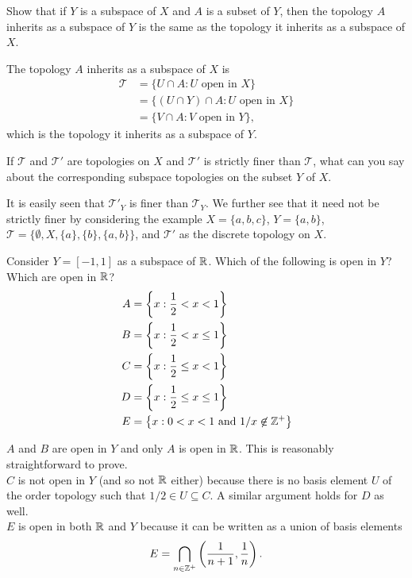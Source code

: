 \begin{exercise}
	Show that if $Y$ is a subspace of $X$ and $A$ is a subset of $Y$, then the topology $A$ inherits as a subspace of $Y$ is the same as the topology it inherits as a subspace of $X$.
\end{exercise}
\begin{solution*}	
	The topology $A$ inherits as a subspace of $X$ is
	\begin{align*}
		\mathcal{T} &= \{ U\cap A : U\text{ open in }X \} \\
			&= \{ (U\cap Y) \cap A : U\text{ open in }X \} \\
			&= \{ V\cap A : V\text{ open in }Y \},
	\end{align*}
	which is the topology it inherits as a subspace of $Y$.
\end{solution*}

\begin{exercise}
	If $\mathcal{T}$ and $\mathcal{T}'$ are topologies on $X$ and $\mathcal{T}'$ is strictly finer than $\mathcal{T}$, what can you say about the corresponding subspace topologies on the subset $Y$ of $X$.
\end{exercise}
\begin{solution*}
	It is easily seen that $\mathcal{T}'_Y$ is finer than $\mathcal{T}_Y$. We further see that it need not be strictly finer by considering the example $X=\{a,b,c\}$, $Y=\{a,b\}$, $\mathcal{T}=\{\emptyset,X,\{a\},\{b\},\{a,b\}\}$, and $\mathcal{T}'$ as the discrete topology on $X$.
\end{solution*}

\begin{exercise}
	Consider $Y=[-1,1]$ as a subspace of $\mathbb{R}$. Which of the following is open in $Y$? Which are open in $\mathbb{R}$?
	\begin{align*}
		A &= \left\{ x : \frac{1}{2} < x < 1 \right\} \\
		B &= \left\{ x : \frac{1}{2} < x \leq 1 \right\} \\
		C &= \left\{ x : \frac{1}{2} \leq x < 1 \right\} \\
		D &= \left\{ x : \frac{1}{2} \leq x \leq 1 \right\} \\
		E &= \left\{ x : 0 < x < 1 \text{ and } 1/x\not\in\mathbb{Z}^+ \right\}
	\end{align*}
\end{exercise}
\begin{solution*}
	$A$ and $B$ are open in $Y$ and only $A$ is open in $\mathbb{R}$. This is reasonably straightforward to prove.\\
	$C$ is not open in $Y$ (and so not $\mathbb{R}$ either) because there is no basis element $U$ of the order topology such that $1/2 \in U \subseteq C$. A similar argument holds for $D$ as well.\\
	$E$ is open in both $\mathbb{R}$ and $Y$ because it can be written as a union of basis elements
	\[ E = \bigcap_{n\in\mathbb{Z}^+} \left(\frac{1}{n+1},\frac{1}{n}\right). \]
\end{solution*}

